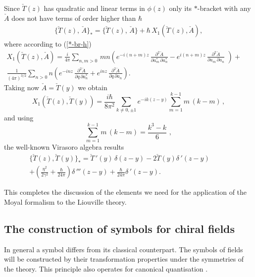 \documentclass[a4paper,12pt]{article}
\begin{document}
\noindent
Since  $\check T(z)$ has quadratic and linear terms in $\phi(z)$ only
its $*$-bracket with any $\check A$ does
not have terms of order higher than $\hbar$
\begin{eqnarray}\label{*-br-T}
\{\check T(z),\,{\check A}\}_*=
\{\check T(z),\,{\check A}\} +\hbar\, X_1(\check T(z),{\check A}),
\end{eqnarray}
where according to (\ref{*-br-h})
\begin{eqnarray}\label{*-br-T-h}
X_1(\check T(z),{\check A})
=\frac{i}{4\pi}\sum_{n,m>0}\,mn\left(  e^{-i(n+m)z}
\,\frac{\partial^2{\check A}}
{\partial a^{*}_m\,\partial a^{*}_n}-
e^{i(n+m)z}\,\frac{\partial^2{\check A}}
{\partial a_m\,\partial a_n}\,\,\right)+~~~~~~~~\nonumber \\
\frac{1}{(4\pi)^{3/2}}\sum_{n>0}n\left(e^{-inz}
\,\frac{\partial^2{\check A}}
{\partial q\,\partial a^{*}_n}+e^{inz}
\,\frac{\partial^2{\check A}}
{\partial q\,\partial a_n}\right).~~~~~~~~~~~~~~~~~~~~~~~~~~~~~~
\end{eqnarray}
Taking now ${\check A}=\check T(y)$ we obtain
\begin{equation}\label{B4}
X_1(\check T(z),{\check T(y)})=\frac{i\hbar}{8\pi^2}
\sum_{k\neq 0,\pm 1} e^{-ik(z-y)}\sum_{m=1}^{k-1}m\,(k-m)\,,
\end{equation}
 and using
\begin{equation}\label{B5}
\sum_{m=1}^{k-1}m\,(k-m)=\frac{k^3-k}{6}\,\,,
\end{equation}
the well-known Virasoro algebra results
\begin{eqnarray}\label{*B-T-T}
\{\check{ T} (z),\check{ T}(y)\}_*=
\check{ T}\,'(y)\,\delta (z-y) -2\check{T}(y)\delta\,'(z-y)
~~~~~~~~~~~~\nonumber \\
+\left(\frac{\eta^2}{2\gamma^2}+\frac{\hbar}{24\pi}\right)\delta\,'''(z-y)+
\frac{\hbar}{24\pi}\delta\,'(z-y).
\end{eqnarray}

\noindent
This completes the discussion of the elements we need for the application
of the Moyal formalism to the Liouville theory.


\subsection{The construction of symbols for chiral fields}

In general a symbol differs from its classical counterpart.  The
symbols of fields will be constructed by their transformation
properties under the symmetries of the theory. This principle also
operates for canonical quantisation .
\end{document}
